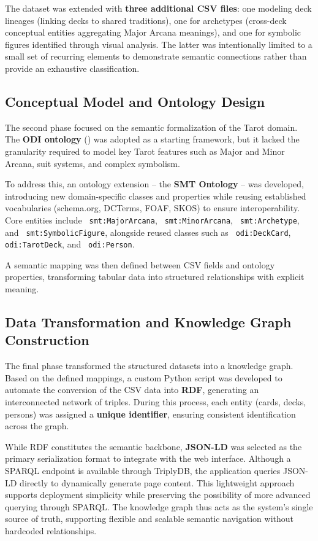 \documentclass[11pt]{article}
\begin{document}
The dataset was extended with \textbf{three additional CSV files}: one modeling deck lineages (linking decks to shared traditions), one for archetypes (cross-deck conceptual entities aggregating Major Arcana meanings), and one for symbolic figures identified through visual analysis. The latter was intentionally limited to a small set of recurring elements to demonstrate semantic connections rather than provide an exhaustive classification.

\subsection{Conceptual Model and Ontology Design}
The second phase focused on the semantic formalization of the Tarot domain. The \textbf{ODI ontology} () was adopted as a starting framework, but it lacked the granularity required to model key Tarot features such as Major and Minor Arcana, suit systems, and complex symbolism.

To address this, an ontology extension – the \textbf{SMT Ontology} – was developed, introducing new domain-specific classes and properties while reusing established vocabularies (schema.org, DCTerms, FOAF, SKOS) to ensure interoperability. 
Core entities include \texttt{ smt:MajorArcana}, \texttt{ smt:MinorArcana}, \texttt{ smt:Archetype}, and \texttt{ smt:SymbolicFigure}, alongside reused classes such as \texttt{ odi:DeckCard}, \texttt{ odi:TarotDeck}, and \texttt{ odi:Person}. 

A semantic mapping was then defined between CSV fields and ontology properties, transforming tabular data into structured relationships with explicit meaning.

\subsection{Data Transformation and Knowledge Graph Construction}
The final phase transformed the structured datasets into a knowledge graph. Based on the defined mappings, a custom Python script was developed to automate the conversion of the CSV data into \textbf{RDF}, generating an interconnected network of triples. During this process, each entity (cards, decks, persons) was assigned a \textbf{unique identifier}, ensuring consistent identification across the graph.

While RDF constitutes the semantic backbone, \textbf{JSON-LD} was selected as the primary serialization format to integrate with the web interface. Although a SPARQL endpoint is available through TriplyDB, the application queries JSON-LD directly to dynamically generate page content. This lightweight approach supports deployment simplicity while preserving the possibility of more advanced querying through SPARQL. The knowledge graph thus acts as the system’s single source of truth, supporting flexible and scalable semantic navigation without hardcoded relationships.
\end{document}
